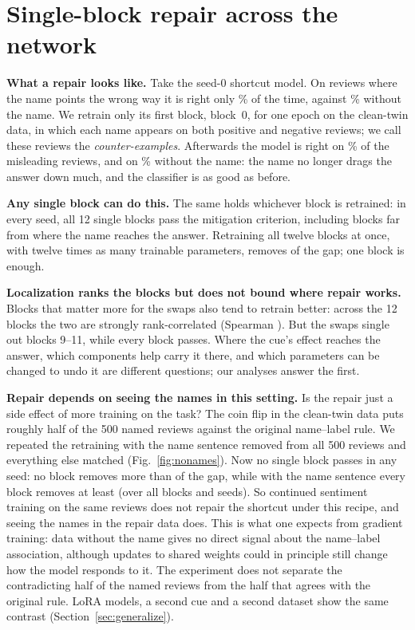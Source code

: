 \section{Single-block repair across the network}
\label{sec:fix}

\textbf{What a repair looks like.} Take the seed-0 shortcut model. On reviews where the name points the wrong way it
is right only \exOppBeforePctFullFTsZero\% of the time, against \exNoneBeforePctFullFTsZero\% without the name. We retrain
only its first block, block~0, for one epoch on the clean-twin data, in which each name appears on both positive and
negative reviews; we call these reviews the \emph{counter-examples}. Afterwards the model is right on
\exOppAfterPctFullFTsZero\% of the misleading reviews, and on \exNoneAfterPctFullFTsZero\% without the name: the name no
longer drags the answer down much, and the classifier is as good as before.

\textbf{Any single block can do this.} The same holds whichever block is retrained: in every seed, all 12 single
blocks pass the mitigation criterion, including blocks far from where the name reaches the answer. Retraining all
twelve blocks at once, with twelve times as many trainable parameters, removes \retrainRemovedAllFullFTRange{} of the
gap; one block is enough.

\textbf{Localization ranks the blocks but does not bound where repair works.} Blocks that matter more for the swaps also
tend to retrain better: across the 12 blocks the two are strongly rank-correlated (Spearman
\spearmanSwapRetrainFullFTRange). But the swaps single out blocks 9--11, while every block passes. Where the cue's
effect reaches the answer, which components help carry it there, and which parameters can be changed to undo it are
different questions; our analyses answer the first.

\textbf{Repair depends on seeing the names in this setting.} Is the repair just a side effect of more training on the
task? The coin flip in the clean-twin data puts roughly half of the 500 named reviews against the original name--label
rule. We repeated the retraining with the name sentence removed from all 500 reviews and everything else matched
(Fig.~\ref{fig:nonames}). Now no single block passes in any seed: no block removes more than \ccNoNamesMaxFullFT{} of
the gap, while with the name sentence every block removes at least \fbMinWithFullFT{} (over all blocks and seeds). So
continued sentiment training on the same reviews does not repair the shortcut under this recipe, and seeing the names
in the repair data does. This is what one expects from gradient training: data without the name gives no direct
signal about the name--label association, although updates to shared weights could in principle still change how the
model responds to it. The experiment does not separate the contradicting half of the named reviews from the half that
agrees with the original rule. LoRA models, a second cue and a second dataset show the same contrast
(Section~\ref{sec:generalize}).

